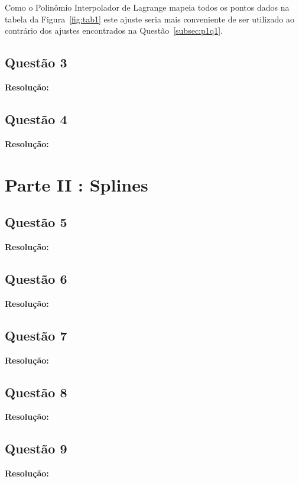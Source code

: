 \documentclass[12pt]{article}
\begin{document}
Como o Polinômio Interpolador de Lagrange mapeia todos os pontos dados na tabela da Figura~\ref{fig:tab1} este ajuste seria mais conveniente de ser utilizado ao contrário dos ajustes encontrados na Questão~\ref{subsec:p1q1}.

\subsection{Questão 3}
\label{subsec:p1q3}

\textbf{Resolução:}

\subsection{Questão 4}
\label{subsec:p1q4}

\textbf{Resolução:}

\section{Parte II : Splines}
\label{sec:parte2}

\subsection{Questão 5}
\label{subsec:p2q5}

\textbf{Resolução:}

\subsection{Questão 6}
\label{subsec:p2q6}

\textbf{Resolução:}

\subsection{Questão 7}
\label{subsec:p2q7}

\textbf{Resolução:}

\subsection{Questão 8}
\label{subsec:p2q8}

\textbf{Resolução:}

\subsection{Questão 9}
\label{subsec:p2q9}

\textbf{Resolução:}
\end{document}
